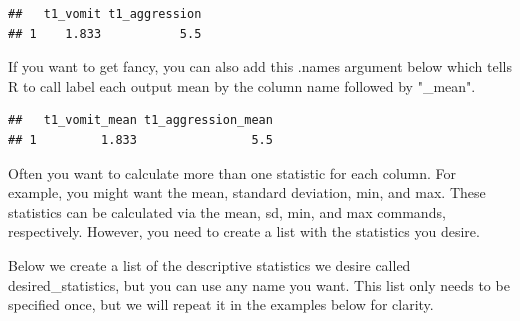 \documentclass[
]{krantz}
\makeatletter
\newenvironment{Shaded}{\begin{snugshade}}{\end{snugshade}}
\newcommand{\DataTypeTok}[1]{\textcolor[rgb]{0.27,0.27,0.27}{#1}}
\newcommand{\KeywordTok}[1]{\textcolor[rgb]{0.27,0.27,0.27}{\textbf{#1}}}
\newcommand{\NormalTok}[1]{#1}
\newcommand{\OperatorTok}[1]{\textcolor[rgb]{0.43,0.43,0.43}{\textbf{#1}}}
\newcommand{\OtherTok}[1]{\textcolor[rgb]{0.37,0.37,0.37}{#1}}
\newcommand{\StringTok}[1]{\textcolor[rgb]{0.5,0.5,0.5}{#1}}
\newenvironment{kframe}{%
\medskip{}
\setlength{\fboxsep}{.8em}
 \def\at@end@of@kframe{}%
 \ifinner\ifhmode%
  \def\at@end@of@kframe{\end{minipage}}%
  \begin{minipage}{\columnwidth}%
 \fi\fi%
 \def\FrameCommand##1{\hskip\@totalleftmargin \hskip-\fboxsep
 \colorbox{shadecolor}{##1}\hskip-\fboxsep
     \hskip-\linewidth \hskip-\@totalleftmargin \hskip\columnwidth}%
 \MakeFramed {\advance\hsize-\width
   \@totalleftmargin\z@ \linewidth\hsize
   \@setminipage}}%
 {\par\unskip\endMakeFramed%
 \at@end@of@kframe}
\renewenvironment{Shaded}{\begin{kframe}}{\end{kframe}}
\makeatother
\begin{document}
\begin{Shaded}
\end{Shaded}

\begin{verbatim}
##   t1_vomit t1_aggression
## 1    1.833           5.5
\end{verbatim}

If you want to get fancy, you can also add this .names argument below which tells R to call label each output mean by the column name followed by "\_mean".

\begin{Shaded}
\end{Shaded}

\begin{verbatim}
##   t1_vomit_mean t1_aggression_mean
## 1         1.833                5.5
\end{verbatim}

Often you want to calculate more than one statistic for each column. For example, you might want the mean, standard deviation, min, and max. These statistics can be calculated via the mean, sd, min, and max commands, respectively. However, you need to create a list with the statistics you desire.

Below we create a list of the descriptive statistics we desire called desired\_statistics, but you can use any name you want. This list only needs to be specified once, but we will repeat it in the examples below for clarity.
\end{document}
